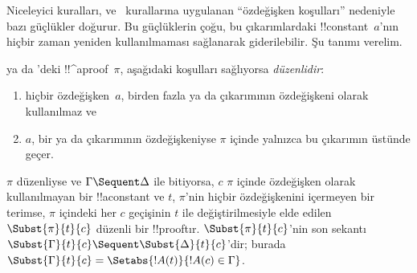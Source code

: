 \documentclass[../../../include/open-logic-section]{subfiles}
\begin{document}


Niceleyici kuralları, \LeftR{\lexists} ve~\RightR{\lforall} kurallarına
uygulanan ``özdeğişken koşulları'' nedeniyle bazı güçlükler doğurur. Bu
güçlüklerin çoğu, bu çıkarımlardaki !!{constant}~$a$'nın hiçbir zaman
yeniden kullanılmaması sağlanarak giderilebilir. Şu tanımı verelim.

\begin{defn}
 ya da 'deki !!^a{proof}~$\pi$, aşağıdaki koşulları
sağlıyorsa \emph{düzenlidir}:
\begin{enumerate}
  \item hiçbir özdeğişken~$a$, birden fazla \LeftR{\lexists} ya da
  \RightR{\lforall} çıkarımının özdeğişkeni olarak kullanılmaz ve
  \item $a$, bir \LeftR{\lexists} ya da \RightR{\lforall} çıkarımının
  özdeğişkeniyse $\pi$ içinde yalnızca bu çıkarımın üstünde geçer.
\end{enumerate}
\end{defn}

\begin{lem} $\pi$ düzenliyse ve $\Gamma \Sequent
\Delta$ ile bitiyorsa, $c$ $\pi$ içinde özdeğişken olarak kullanılmayan
bir !!a{constant} ve $t$, $\pi$'nin hiçbir özdeğişkenini içermeyen bir
terimse, $\pi$ içindeki her $c$ geçişinin $t$ ile değiştirilmesiyle elde
edilen $\Subst{\pi}{t}{c}$ düzenli bir !!{proof}{}tır. $\Subst{\pi}{t}{c}$'nin
son sekantı $\Subst{\Gamma}{t}{c} \Sequent \Subst{\Delta}{t}{c}$'dir;
burada $\Subst{\Gamma}{t}{c} = \Setabs{!A(t)}{!A(c) \in \Gamma}$.
\end{lem}
\end{document}
